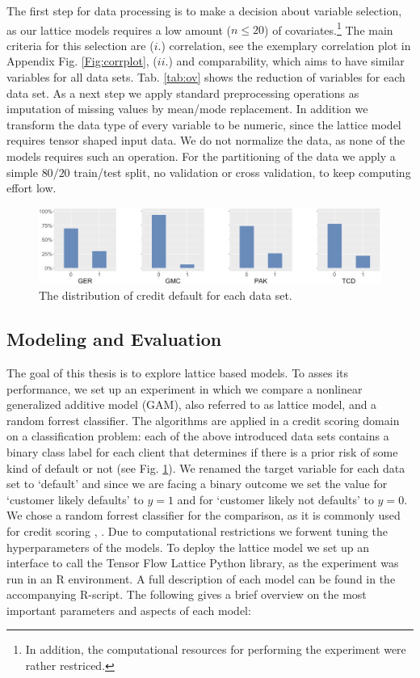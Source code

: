 The first step for data processing is to make a decision about variable selection, as our lattice models requires a low amount ($n \leq 20$) of covariates.\footnote{ In addition, the computational resources for performing the experiment were rather restriced.} The main criteria for this selection are ($i$.) correlation, see the exemplary correlation plot in Appendix Fig. \ref{Fig:corrplot}, ($ii$.) and comparability, which aims to have similar variables for all data sets. Tab. \ref{tab:ov} shows the reduction of variables for each data set. As a next step we apply standard preprocessing operations as imputation of missing values by mean/mode replacement. In addition we transform the data type of every variable to be numeric, since the lattice model requires tensor shaped input data. We do not normalize the data, as none of the models requires such an operation. For the partitioning of the data we apply a simple $80/20$ train/test split, no validation or cross validation, to keep computing effort low.

\begin{figure}[htb!]
		\centering
		\includegraphics[width=1\textwidth]{img/defhist} %
		\caption{The distribution of credit default for each data set.}
		\label{Fig:defhist}
\end{figure}

\subsection{Modeling and Evaluation}

The goal of this thesis is to explore lattice based models. To asses its performance, we set up an experiment in which we compare a nonlinear generalized additive model
(GAM), also referred to as lattice model, and a random forrest classifier. The algorithms are applied in a credit scoring domain on a classification problem: each of the above introduced data sets contains a binary class label for each client that determines if there is a prior risk of some kind of default or not (see Fig. \ref{Fig:defhist}). We renamed the target variable for each data set to `default' and since we are facing a binary outcome we set the value for `customer likely defaults' to $y = 1$ and for `customer likely not defaults' to $y = 0$. We chose a random forrest classifier for the comparison, as it is commonly used for credit scoring \citep{baesens2003benchmarking}, \citep{lessmann2015benchmarking}. Due to computational restrictions we forwent tuning the hyperparameters of the models. To deploy the lattice model we set up an interface to call the Tensor Flow Lattice Python library, as the experiment was run in an \textsf{R} environment. A full description of each model can be found in the accompanying \textsf{R}-script. The following gives a brief overview on the most important parameters and aspects of each model:

